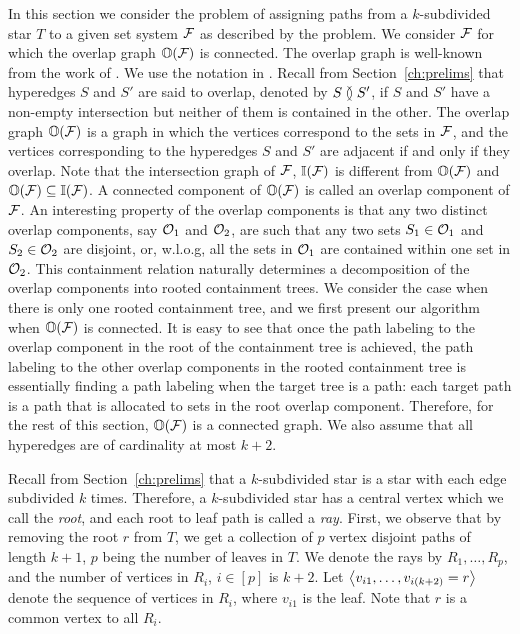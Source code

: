 In this section we consider the problem of assigning paths from a
$k$-subdivided star $T$ to a given set system ${\cal F}$ as described by
the \CFTPLKTREE problem.  We consider
${\cal F}$ for which the overlap graph $\mathbb O({\cal F})$ is connected.  The
overlap graph is well-known from the work of
\cite{kklv10,nsnrs09,wlh02}.  We use the notation in
\cite{kklv10}. Recall from Section~\ref{ch:prelims} that hyperedges
$S$ and $S'$ are said to overlap, denoted by $S \between S'$, if $S$
and $S'$ have a non-empty intersection but neither of them is
contained in the other. The overlap graph $\mathbb O({\cal F})$ is a graph in
which the vertices correspond to the sets in ${\cal F}$, and the vertices
corresponding to the hyperedges $S$ and $S'$ are adjacent if and only
if they overlap.  Note that the intersection graph of ${\cal F}$,
$\mathbb I({\cal F})$ is different from $\mathbb O({\cal F})$ and $\mathbb O({\cal F}) \subseteq
\mathbb I({\cal F})$.  A connected component of $\mathbb O({\cal F})$ is called an overlap
component of ${\cal F}$.  An interesting property of the overlap components
is that any two distinct overlap components, say ${\cal O}_1$ and ${\cal O}_2$,
are such that any two sets $S_1 \in {\cal O}_1$ and $S_2 \in {\cal O}_2$ are
disjoint, or, w.l.o.g, all the sets in ${\cal O}_1$ are contained within
one set in ${\cal O}_2$.  This containment relation naturally determines a
decomposition of the overlap components into rooted containment trees.
We consider the case when there is only one rooted containment tree,
and we first present our algorithm when $\mathbb O({\cal F})$ is connected.  It
is easy to see that once the path labeling to the overlap component in
the root of the containment tree is achieved, the path labeling to the
other overlap components in the rooted containment tree is essentially
finding a path labeling when the target tree is a path: each target
path is a path that is allocated to sets in the root overlap
component.  Therefore, for the rest of this section, $\mathbb O({\cal F})$ is a
connected graph. We also assume that all hyperedges are of cardinality
at most $k+2$.

Recall from Section~\ref{ch:prelims} that a $k$-subdivided star is a
star with each edge subdivided $k$ times. Therefore, a $k$-subdivided
star has a central vertex which we call the {\em root}, and each root
to leaf path is called a {\em ray}. First, we observe that by removing
the root $r$ from $T$, we get a collection of $p$ vertex disjoint
paths of length $k+1$, $p$ being the number of leaves in $T$.  We
denote the rays by $R_1, \ldots, R_p$, and the number of vertices in
$R_i$, $i \in [p]$ is $k+2$.  Let $\left\langle v_{i1},\ldots,v_{i(k+2)}=r \right\rangle$
denote the sequence of vertices in $R_i$, where $v_{i1}$ is the
leaf. Note that $r$ is a common vertex to all $R_i$.


